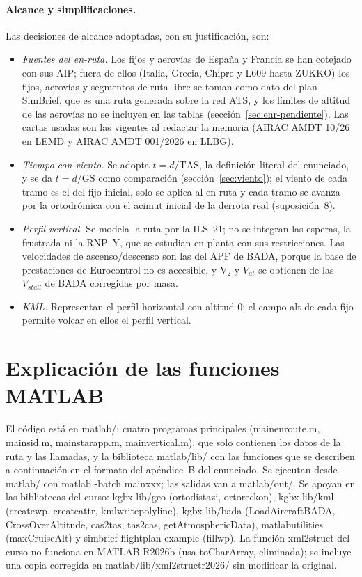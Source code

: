\documentclass[11pt,a4paper]{article}
\DeclareRobustCommand{\m}[1]{{\ttfamily\def\_{\textunderscore\penalty100\relax}#1}}
\begin{document}
\paragraph{Alcance y simplificaciones.} Las decisiones de alcance adoptadas, con su justificación, son:
\begin{itemize}
\item \emph{Fuentes del en-ruta.} Los fijos y aerovías de España y Francia se han cotejado con sus AIP; fuera de ellos (Italia, Grecia, Chipre y L609 hasta ZUKKO) los fijos, aerovías y segmentos de ruta libre se toman como dato del plan SimBrief, que es una ruta generada sobre la red ATS, y los límites de altitud de las aerovías no se incluyen en las tablas (sección~\ref{sec:enr-pendiente}). Las cartas usadas son las vigentes al redactar la memoria (AIRAC AMDT 10/26 en LEMD y AIRAC AMDT 001/2026 en LLBG).
\item \emph{Tiempo con viento.} Se adopta $t=d/\mathrm{TAS}$, la definición literal del enunciado, y se da $t=d/\mathrm{GS}$ como comparación (sección~\ref{sec:viento}); el viento de cada tramo es el del fijo inicial, solo se aplica al en-ruta y cada tramo se avanza por la ortodrómica con el acimut inicial de la derrota real (suposición~8).
\item \emph{Perfil vertical.} Se modela la ruta por la ILS~21; no se integran las esperas, la frustrada ni la RNP~Y, que se estudian en planta con sus restricciones. Las velocidades de ascenso/descenso son las del APF de BADA, porque la base de prestaciones de Eurocontrol no es accesible, y V$_2$ y $V_{at}$ se obtienen de las $V_{stall}$ de BADA corregidas por masa.
\item \emph{KML.} Representan el perfil horizontal con altitud 0; el campo \m{alt} de cada fijo permite volcar en ellos el perfil vertical.
\end{itemize}

\appendix
\clearpage
\section{Explicación de las funciones MATLAB}\label{ap:funciones}

El código está en \m{matlab/}: cuatro programas principales (\m{main\_enroute.m}, \m{main\_sid.m}, \m{main\_star\_app.m}, \m{main\_vertical.m}), que solo contienen los datos de la ruta y las llamadas, y la biblioteca \m{matlab/lib/} con las funciones que se describen a continuación en el formato del apéndice~B del enunciado. Se ejecutan desde \m{matlab/} con \m{matlab -batch main\_xxx}; las salidas van a \m{matlab/out/}. Se apoyan en las bibliotecas del curso: \m{kgbx-lib/geo} (\m{orto\_distazi}, \m{orto\_reckon}), \m{kgbx-lib/kml} (\m{create\_wp}, \m{create\_attr}, \m{kmlwrite\_polyline}), \m{kgbx-lib/bada} (\m{LoadAircraftBADA}, \m{CrossOverAltitude}, \m{cas2tas}, \m{tas2cas}, \m{getAtmosphericData}), \m{matlab\_utilities} (\m{maxCruiseAlt}) y \m{simbrief-flightplan-example} (\m{fill\_wp}). La función \m{xml2struct} del curso no funciona en MATLAB R2026b (usa \m{toCharArray}, eliminada); se incluye una copia corregida en \m{matlab/lib/xml2struct\_r2026/} sin modificar la original.
\end{document}

